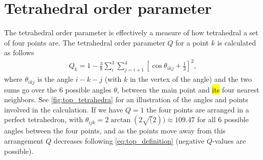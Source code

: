 \section{Tetrahedral order parameter}
The tetrahedral order parameter\cite{errington2001relationship} is effectively a measure of how tetrahedral a set of four points are. The tetrahedral order parameter $Q$ for a point $k$ is calculated as follows%
\begin{align}
    Q_k = 1 - \frac{3}{8}\sum_i^3\sum_{j=i+1}^4 \left[ \cos \theta_{ikj} + \frac{1}{3} \right]^2,\label{eq:top_definition}
\end{align}%
%
%     
%     
%
where $\theta_{ikj}$ is the angle %
$i-k-j$ (with $k$ in the vertex of the angle) %
and the two sums go over the 6 possible angles $\theta$, between the main point and \hl{its} four nearest neighbors. See \cref{fig:top_tetrahedra} for an illustration of the angles and points involved in the calculation. If we have $Q = 1$ the four points are arranged in a perfect tetrahedron, with $\theta_{ijk} = 2\arctan(2\sqrt(2)) \approx 109.47$ for all 6 possible angles between the four points, and as the points move away from this arrangement $Q$ decreases following \cref{eq:top_definition} (negative $Q$-values are possible).
